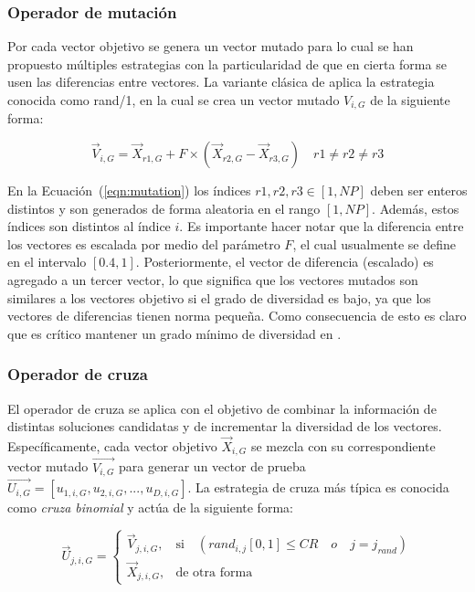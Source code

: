 \subsubsection{Operador de mutación}

Por cada vector objetivo se genera un vector mutado para lo cual se han propuesto múltiples estrategias con la particularidad de que en cierta forma
se usen las diferencias entre vectores.
%
La variante clásica de \DE{} aplica la estrategia conocida como rand/1, en la cual se crea un vector mutado $V_{i,G}$ de la siguiente forma:

\begin{equation}\label{eqn:mutation}
\vec{V}_{i,G} = \vec{X}_{r1, G} + F \times (\vec{X}_{r2, G} - \vec{X}_{r3, G}) \quad r1 \neq r2 \neq r3
\end{equation}

En la Ecuación~(\ref{eqn:mutation}) los índices $r1, r2, r3 \in [1,NP]$ deben ser enteros distintos y son generados de forma aleatoria
en el rango $[1, NP]$.
%
Además, estos índices son distintos al índice $i$.
%
Es importante hacer notar que la diferencia entre los vectores es escalada por medio del parámetro $F$, el cual usualmente se define en el intervalo $[0.4, 1]$.
%
Posteriormente, el vector de diferencia (escalado) es agregado a un tercer vector, lo que significa que
los vectores mutados son similares a los vectores objetivo si el grado de diversidad es bajo, ya que los vectores de diferencias tienen norma pequeña.
%
Como consecuencia de esto es claro que es crítico mantener un grado mínimo de diversidad en \DE{}.

\subsubsection{Operador de cruza}

El operador de cruza se aplica con el objetivo de combinar la información de distintas soluciones candidatas y de incrementar la diversidad de los vectores.
%
Específicamente, cada vector objetivo $\vec{X}_{i,G}$ se mezcla con su correspondiente vector mutado $\vec{V_{i,G}}$ para generar un vector de 
prueba $\vec{U_{i,G}} = [u_{1,i,G},u_{2,i,G}, ..., u_{D,i,G} ]$.
%
La estrategia de cruza más típica es conocida como \textit{cruza binomial} y actúa de la siguiente forma:

\begin{equation} \label{eqn:crossover}
\vec{U}_{j,i,G}= 
\begin{cases}
    \vec{V}_{j,i,G},& \text{si} \quad (rand_{i,j}[0,1] \leq CR \quad o \quad j = j_{rand}  )\\
    \vec{X}_{j,i,G},              & \text{de otra forma}
\end{cases}
\end{equation}

